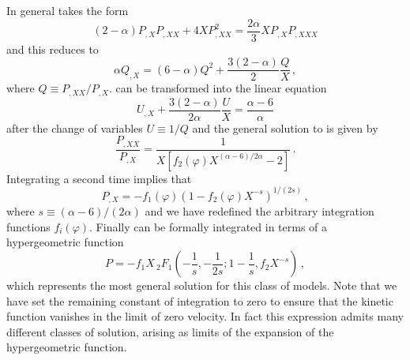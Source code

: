 In general  takes the form 
% 
\begin{equation}
\label{eq:genPXeqn-multi}
(2-\alpha ) P_{,X}P_{,XX} + 4XP^2_{,XX} = \frac{2\alpha }{3}
X P_{,X}P_{,XXX}
\end{equation}
% 
and this reduces to 
% 
\begin{equation}
\label{eq:genreduce-multi}
\alpha Q_{,X} = (6-\alpha ) Q^2 + \frac{3(2-\alpha )}{2} \frac{Q}{X} \, ,
\end{equation}
% 
where $Q \equiv P_{,XX}/P_{,X}$. 
 can be transformed into the 
linear equation
% 
\begin{equation}
\label{eq:lineargen-multi}
U_{,X}+ \frac{3(2-\alpha )}{2\alpha} \frac{U}{X} = \frac{\alpha -6}{\alpha}
\end{equation}
% 
after the change of variables $U \equiv 1/Q$
and the general solution to  is given by
%  
\begin{equation}
\label{eq:gensolnlinear-multi}
\frac{P_{,XX}}{P_{,X}} = \frac{1}{X\left[ f_2(\varphi) X^{(\alpha -6)/2\alpha}
-2 \right] } \, .
\end{equation}
% 
Integrating a second time implies that
% 
\begin{equation}
\label{eq:secondint-multi}
P_{,X} = -f_1 (\varphi ) \left( 1- f_2(\varphi ) X^{-s} \right)^{1/(2s)}  \, ,
\end{equation}
% 
where $s \equiv (\alpha -6 )/(2 \alpha)$ and we have redefined 
the arbitrary integration functions $f_i(\varphi )$.  
Finally  can be formally integrated 
in terms of a hypergeometric function
%  
\begin{equation}
 \label{eq:thirdint-multi}
 P= -f_1X \,{_2}F_1 \left( -\frac{1}{s}, -\frac{1}{2s}; 1-\frac{1}{s}, f_2X^{-s}
\right)  \, ,
\end{equation}
%  
which represents the most general solution for this class of models. 
Note that we have set the
remaining constant of integration to zero to ensure 
that the kinetic function vanishes in the limit of
zero velocity. In fact this expression admits many 
different classes of solution, arising as limits
of the expansion of the hypergeometric function.






